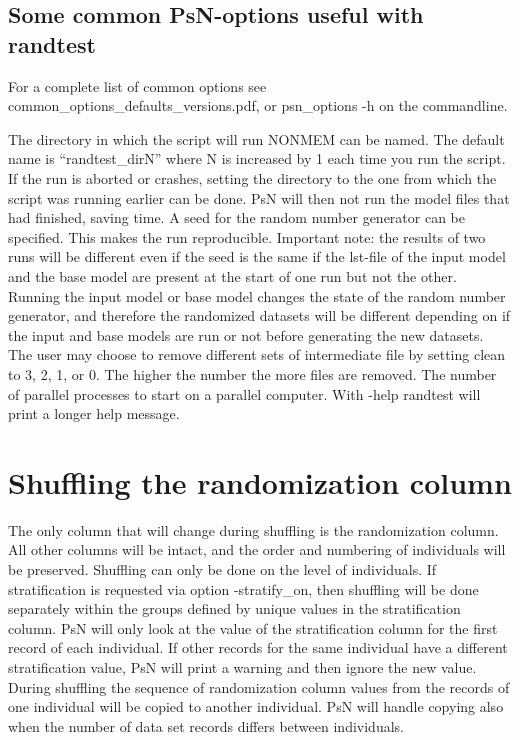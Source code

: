 \subsection{Some common PsN-options useful with randtest}

For a complete list of common options see common\_options\_defaults\_versions.pdf, or psn\_options -h on the commandline.

\begin{optionlist}
The directory in which the script will run NONMEM can be named. The default name is “randtest\_dirN” where N is increased by 1 each time you run the script. If the run is aborted or crashes, setting the directory to the one from which the script was running earlier can be done. PsN will then not run the model files that had finished, saving time. 
\nextopt
{}
A seed for the random number generator can be specified. This makes the run reproducible. Important note: the results of two runs will be different even if the seed is the same if the lst-file of the input model and the base model are present at the start of one run but not the other. Running the input model or base model changes the state of the random number generator, and therefore the randomized datasets will be different depending on if the input and base models are run or not before generating the  new datasets. 
\nextopt
{}
The user may choose to remove different sets of intermediate file by setting clean to 3, 2, 1, or 0. The higher the number the more files are removed. 
\nextopt
{}
The number of parallel processes to start on a parallel computer. 
\nextopt
{}
With -help randtest will print a longer help message. 
\nextopt
\end{optionlist}

\section{Shuffling the randomization column}

The only column that will change during shuffling is the randomization column. All other columns will be intact, and the order and numbering of individuals will be preserved. Shuffling can only be done on the level of individuals. If stratification is requested via option -stratify\_on, then shuffling will be done separately within the groups defined by unique values in the stratification column. PsN will only look at the value of the stratification column for the first record of each individual. If other records for the same individual have a different stratification value, PsN will print a warning and then ignore the new value.
During shuffling the sequence of randomization column values from the records of one individual will be copied to another individual. PsN will handle copying also when the number of data set records differs between individuals.

